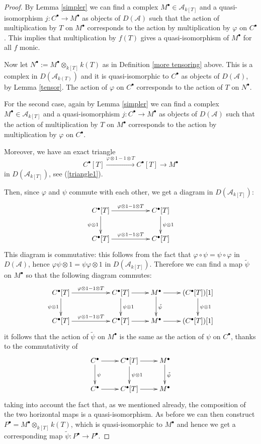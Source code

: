 \documentclass{amsart}
\begin{document}
\begin{proof}
By Lemma \ref{simpler} we can find a complex $M^{\bullet}\in \mathcal{A}_{k[T]}$ and a quasi-isomorphism $j : C^\bullet \to M^\bullet$ as objects of $D(\mathcal{A})$ such that the action of multiplication by $T$ on $M^\bullet$ corresponds to the action by multiplication by $\varphi$ on $C^\bullet$. This implies that multiplication by $f(T)$ gives a quasi-isomorphism of $M^{\bullet}$ for all $f$ monic.

Now let $N^{\bullet}:=M^\bullet \otimes_{k[T]} k(T)$ as in Definition \ref{more tensoring} above. This is a complex in $D(\mathcal{A}_{k(T)})$ and it is quasi-isomorphic to $C^{\bullet}$ as objects of $D(\mathcal{A})$, by Lemma \ref{tensor}. The action of $\varphi$ on $C^{\bullet}$ corresponds to the action of $T$ on $N^{\bullet}$.

For the second case, again by Lemma \ref{simpler} we can find a complex $M^{\bullet}\in \mathcal{A}_{k[T]}$ and a quasi-isomorphism
$j : C^\bullet \to M^\bullet$ as objects of $D(\mathcal{A})$ such that the action of multiplication by $T$ on $M^\bullet$ corresponds to the action by multiplication by $\varphi$ on $C^\bullet$.

Moreover, we have an exact triangle
$$C^{\bullet}[T] \xrightarrow{\varphi\otimes 1-1\otimes T}C^{\bullet}[T]\longrightarrow M^{\bullet}$$
in $D(\mathcal{A}_{k[T]})$, see (\ref{triangle1}).

Then, since $\varphi$ and $\psi$ commute with each other, we get a diagram in $D(\mathcal{A}_{k[T]})$:
$$
\xymatrix{
C^\bullet[T] \ar[rr]^{\varphi \otimes 1 - 1 \otimes T}
\ar[d]_{\psi \otimes 1} & &
C^\bullet[T] \ar[d]^{\psi \otimes 1} \\
C^\bullet[T] \ar[rr]^{\varphi \otimes 1 - 1 \otimes T} & &
C^\bullet[T]
}
$$
This diagram is commutative: this follows from the fact that $\varphi\circ \psi=\psi \circ \varphi$ in $D(\mathcal{A})$, hence $\varphi \psi\otimes 1=\psi \varphi\otimes 1$ in  $D(\mathcal{A}_{k[T]})$. Therefore we can find a map $\tilde{\psi}$ on $M^{\bullet}$ so that the following diagram commutes:
$$
\xymatrix{
C^\bullet[T] \ar[rr]^{\varphi \otimes 1 - 1 \otimes T}
\ar[d]_{\psi\otimes 1} & & C^\bullet[T] \ar[d]^{\psi\otimes 1}  \ar[r] &
M^\bullet \ar[d]^{\tilde{\psi}} \ar[r] & (C^\bullet[T])[1] \ar[d]^{\psi\otimes 1} \\
C^\bullet[T] \ar[rr]^{\varphi \otimes 1 - 1 \otimes T} & &
C^\bullet[T] \ar[r] &
M^\bullet \ar[r] & (C^\bullet[T])[1]
}
$$
it follows that the action of $\tilde{\psi}$ on $M^{\bullet}$ is the same as the action of $\psi$ on $C^{\bullet}$, thanks to the commutativity of 
$$
\xymatrix{
C^\bullet \ar[r] \ar[d]^{\psi} & C^\bullet[T] \ar[r]\ar[d]^{\psi\otimes 1} & M^\bullet \ar[d]^{\tilde{\psi}}\\
C^\bullet \ar[r] & C^\bullet[T] \ar[r] & M^\bullet
}
$$
taking into account the fact that, as we mentioned already, the composition of the two horizontal maps is a quasi-isomorphism. As before we can then construct $P^{\bullet}=M^\bullet \otimes_{k[T]} k(T)$, which is quasi-isomorphic to $M^{\bullet}$ and hence we get a corresponding map $\tilde{\psi}: P^{\bullet}\to P^{\bullet}$.


\end{proof}
\end{document}
